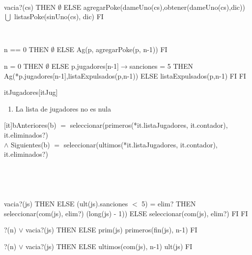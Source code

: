 \begin{Representacion}
	~

	{\IF vacia?(cs) THEN
		$\emptyset$
	ELSE
		agregarPoke(dameUno(cs),obtener(dameUno(cs),dic)) $\bigcup$ listasPoke(sinUno(cs), dic)
	FI}
		
	~

	{\IF n == 0 THEN
		$\emptyset$
	ELSE
		Ag(p, agregarPoke(p, n-1))
	FI}
	
	{\IF n = 0 THEN
		$\emptyset$
	ELSE
		{\IF p.jugadores[n-1]$\rightarrow$sanciones = 5 THEN
			Ag(*p.jugadores[n-1],listaExpulsados(p,n-1))
		ELSE
			listaExpulsados(p,n-1)
		FI}
	FI}
	
	



	\begin{Estructura}{itJugadores}[itJug]
		\begin{Tupla}[itJug]
		\end{Tupla}
	\end{Estructura}


	\begin{enumerate}

		\item La lista de jugadores no es nula

	\end{enumerate}




	[it]{b}{Anteriores(b) $=$ seleccionar(primeros(*it.listaJugadores, it.contador), it.eliminados?) \\ $\land$ Siguientes(b) $=$ seleccionar(ultimos(*it.listaJugadores, it.contador), it.eliminados?)}

	~




	~

	{\IF vacia?(js) THEN
		\secuvacia
	ELSE
		{\IF (ult(js).sanciones $<$ 5) = elim? THEN  seleccionar(com(js), elim?) \circulito (long(js) - 1)) ELSE seleccionar(com(js), elim?) FI}
	FI}

	{?(n) $\lor$ vacia?(js) THEN
		\secuvacia
	ELSE
		prim(js) \puntito primeros(fin(js), n-1)
	FI}


	{?(n) $\lor$ vacia?(js) THEN
		\secuvacia
	ELSE
		ultimos(com(js), n-1) \circulito ult(js)
	FI}

\end{Representacion}


